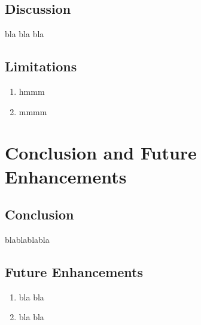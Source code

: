\section{Discussion}
\vspace{-18pt}
bla bla bla
\section{Limitations}
\begin{enumerate}
	\item hmmm
	\item mmmm
\end{enumerate}
\chapter{Conclusion and Future Enhancements}
\vspace{-18pt}
\section{Conclusion}
\vspace{-18pt}
blablablabla
\section{Future Enhancements}
\begin{enumerate}
	\item bla bla
	\item bla bla
\end{enumerate}
\renewcommand\bibname{References} %

